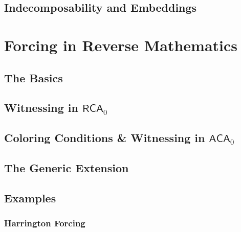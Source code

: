 \documentclass{dcthesis}[]
\theoremstyle{definition}
\newcommand{\RCAo}{\ensuremath{\mathsf{RCA}_0}}
\newcommand{\ACAo}{\ensuremath{\mathsf{ACA}_0}}
\begin{document}
\section{Indecomposability and Embeddings}\label{Indec&Embed}
	

\chapter{Forcing in Reverse Mathematics}\label{Forcing}
	
\section{The Basics}\label{ForcingBasics}
	


\section{Witnessing in \texorpdfstring{\RCAo}{RCA0}}\label{witRCAo}
	
\section{Coloring Conditions \& Witnessing in \texorpdfstring{\ACAo}{ACA0}}\label{witACAo}
	
\section{The Generic Extension}\label{generic}
	
\section{Examples}\label{forcingExamples}
	

	\subsection{Harrington Forcing}\label{harrington}
		
\end{document}
